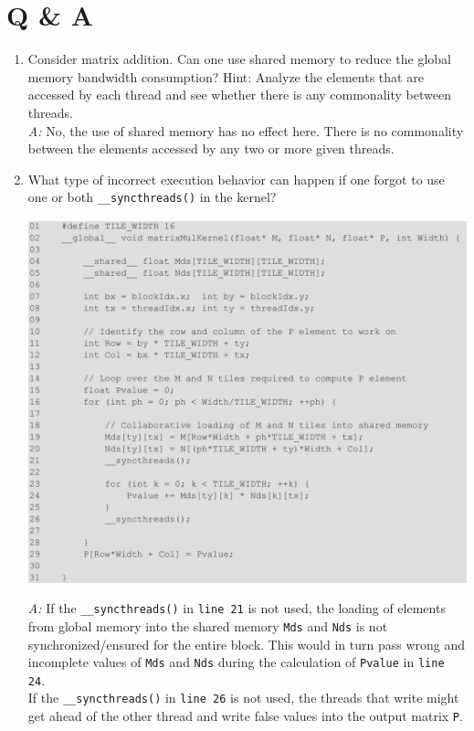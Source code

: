 \section{Q \& A}
\begin{enumerate}
    \item Consider matrix addition. Can one use shared memory to reduce the global memory bandwidth consumption? Hint: Analyze the elements that are accessed by each thread and see whether there is any commonality between threads.
          \\ \textsl{A:} No, the use of shared memory has no effect here. There is no commonality between the elements accessed by any two or more given threads.
    \item What type of incorrect execution behavior can happen if one forgot to use one or both \texttt{\_\_syncthreads()} in the kernel?
          \begin{center}
              \includegraphics[width=0.9\linewidth]{Images/Memories/tiled_kernel.png}
          \end{center}
          \textsl{A:} If the \texttt{\_\_syncthreads()} in \texttt{line 21} is not used, the loading of elements from global memory into the shared memory \texttt{Mds} and \texttt{Nds} is not synchronized/ensured for the entire block. This would in turn pass wrong and incomplete values of \texttt{Mds} and \texttt{Nds} during the calculation of \texttt{Pvalue} in \texttt{line 24}.\\
          If the \texttt{\_\_syncthreads()} in \texttt{line 26} is not used, the threads that write might get ahead of the other thread and write false values into the output matrix \texttt{P}.

\end{enumerate}
